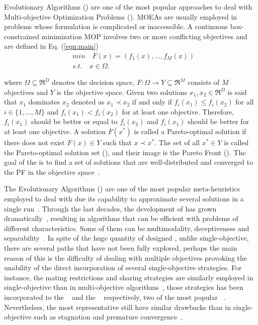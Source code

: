  Evolutionary Algorithms (\MOEAS{}) are one of the most popular approaches to deal with Multi-objective Optimization Problems (\MOPS{}).
%
MOEAs are usually employed in problems whose formulation is complicated or inaccessible.
%
A continuous box-constrained minimization MOP involves two or more conflicting objectives and are defined in Eq. (\ref{eqn:main})
%
\begin{equation}\label{eqn:main}
\begin{split}
&min \quad F(x) = (f_1(x), ..., f_M(x)) \\
&s.t. \quad x \in \Omega.
\end{split}
\end{equation}

where $\Omega \subseteq \Re^D$ denotes the decision space, $F: \Omega \rightarrow Y \subseteq \Re^M$ consists of $M$ objectives and $Y$ is the objective space.
%
Given two solutions $x_1, x_2 \in \Re^D$ is said that $x_1$ dominates $x_2$ denoted as $x_1 \prec x_2$ if and only if $f_i(x_1) \leq f_i(x_2)$ for all $i \in \{1,...,M\}$ and $f_i(x_1) < f_i(x_2)$ for at least one objective.
%
Therefore, $f_i(x_1)$ should be better or equal to $f_i(x_2)$ and $f_i(x_1)$ should be better for at least one objective.
%
A solution $F(x^*)$ is called a Pareto-optimal solution if there does not exist $F(x) \in Y$ such that $x \prec x^*$.
%
The set of all $x^* \in Y$ is called the Pareto-optimal solution set (\PS{}), and their image is the Pareto Front (\PF{}).
%
The goal of the \MOEAS{} is to find a set of solutions that are well-distributed and converged to the PF in the objective space~\cite{trivedi2016survey}.
%

The Evolutionary Algorithms (\EAS{}) are one of the most popular meta-heuristics employed to deal with \MOPS{} due its capability to approximate several solutions in a single run~\cite{das2011real, zhou2011multiobjective}.
%
Through the last decades, the development of \MOEAS{} has grown dramatically~\cite{van1998multiobjective, coello2007mop}, resulting in algorithms that can be efficient with problems of different characteristics.
%
Some of them can be multimodality, deceptiveness and separability~\cite{huband2006review}.
%
In spite of the huge quantity of designed \MOEAS{}, unlike single-objective, there are several paths that have not been fully explored, perhaps the main reason of this is the difficulty of dealing with multiple objectives provoking the unability of the direct incorporation of several single-objective strategies.
%
For instance, the mating restrictions and sharing strategies are similarly employed in single-objective than in multi-objective algorithms~\cite{fonseca1995multiobjective}, those strategies has been incorporated to the \MOEAD{}~\cite{zhang2007moea} and the \NSGAII{}~\cite{deb2002fast} respectively, two of the most popular \MOEAS{}~\cite{trivedi2016survey, zhou2011multiobjective}.
%
Nevertheless, the most representative \MOEAS{} still have similar drawbacks than in single-objective such as stagnation and premature convergence~\cite{ishibuchi2006comparison, castillo2017multi, buche2003self, lu2002dynamic},
%


